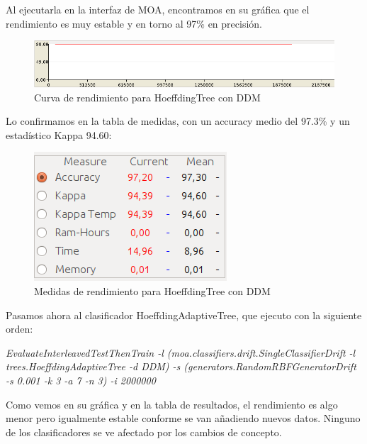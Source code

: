 Al ejecutarla en la interfaz de MOA, encontramos en su gráfica que el rendimiento es muy estable y en torno al 97\% en precisión.

\begin{figure}[H] %
	\centering
	\includegraphics[scale=0.5]{graph51.png}  %
	\caption{Curva de rendimiento para HoeffdingTree con DDM} 
	\label{fig:graph51}
\end{figure}

Lo confirmamos en la tabla de medidas, con un accuracy medio del 97.3\% y un estadístico Kappa 94.60:

\begin{figure}[H] %
	\centering
	\includegraphics[scale=0.5]{measures51.png}  %
	\caption{Medidas de rendimiento para HoeffdingTree con DDM} 
	\label{fig:measure51}
\end{figure}


Pasamos ahora al clasificador HoeffdingAdaptiveTree, que ejecuto con la siguiente orden:

\textit{EvaluateInterleavedTestThenTrain -l (moa.classifiers.drift.SingleClassifierDrift -l \\ trees.HoeffdingAdaptiveTree -d DDM) -s (generators.RandomRBFGeneratorDrift -s 0.001 -k 3 -a 7 -n 3) -i 2000000}

Como vemos en su gráfica y en la tabla de resultados, el rendimiento es algo menor pero igualmente estable conforme se van  añadiendo nuevos datos. Ninguno de los clasificadores se ve afectado por los cambios de concepto.

